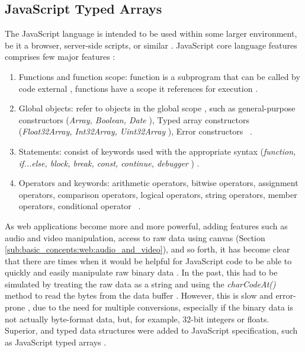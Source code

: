 
\subsection{JavaScript Typed Arrays} %
\label{sub:basic_concepts:web:javascript_typed_arrays}

The JavaScript language \cite{International2009} is intended to be used within some larger environment, be it a browser, server-side scripts, or similar \cite{Grosskurth2005}. JavaScript core language features comprises few major features \cite{MDN2013}:

\begin{enumerate}
\item Functions and function scope: function is a subprogram that can be called by code external \cite{MDN2013}, functions have a scope it references for execution \cite{MDN2013}.
\item Global objects: refer to objects in the global scope \cite{MDN2013}, such as general-purpose constructors (\textit{Array, Boolean, Date} \etc), Typed array constructors (\textit{Float32Array, Int32Array, Uint32Array} \etc), Error constructors \etc\ \cite{MDN2013}.
\item Statements: consist of keywords used with the appropriate syntax (\textit{function, if...else, block, break, const, continue, debugger \etc}) \cite{MDN2013}.
\item Operators and keywords: arithmetic operators, bitwise operators, assignment operators, comparison operators, logical operators, string operators, member operators, conditional operator \etc\ \cite{MDN2013}.
\end{enumerate}

As web applications become more and more powerful, adding features such as audio and video manipulation, access to raw data using canvas \cite{Canvas2013} (Section \ref{sub:basic_concepts:web:audio_and_video}), and so forth, it has become clear that there are times when it would be helpful for JavaScript code to be able to quickly and easily manipulate raw binary data \cite{Canvas2013} \cite{TypedArray2013}. In the past, this had to be simulated by treating the raw data as a string and using the \textit{charCodeAt()} method to read the bytes from the data buffer \cite{MDN2013} \cite{TypedArray2013}. However, this is slow and error-prone \cite{MDN2013}, due to the need for multiple conversions, especially if the binary data is not actually byte-format data, but, for example, 32-bit integers or floats. Superior, and typed data structures were added to JavaScript specification, such as JavaScript typed arrays \cite{MDN2013} \cite{International2009}.

